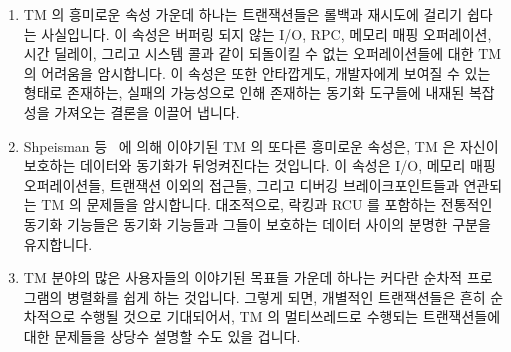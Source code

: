 \begin{enumerate}
\item	TM 의 흥미로운 속성 가운데 하나는 트랜잭션들은 롤백과 재시도에 걸리기
	쉽다는 사실입니다.
	이 속성은 버퍼링 되지 않는 I/O, RPC, 메모리 매핑 오퍼레이션, 시간
	딜레이, 그리고  시스템 콜과 같이 되돌이킬 수 없는
	오퍼레이션들에 대한 TM 의 어려움을 암시합니다.
	이 속성은 또한 안타깝게도, 개발자에게 보여질 수 있는 형태로 존재하는,
	실패의 가능성으로 인해 존재하는 동기화 도구들에 내재된 복잡성을
	가져오는 결론을 이끌어 냅니다.
\item	Shpeisman 등~\cite{TatianaShpeisman2009CppTM} 에 의해 이야기된 TM 의
	또다른 흥미로운 속성은, TM 은 자신이 보호하는 데이터와 동기화가
	뒤엉켜진다는 것입니다.
	이 속성은 I/O, 메모리 매핑 오퍼레이션들, 트랜잭션 이외의 접근들, 그리고
	디버깅 브레이크포인트들과 연관되는 TM 의 문제들을 암시합니다.
	대조적으로, 락킹과 RCU 를 포함하는 전통적인 동기화 기능들은 동기화
	기능들과 그들이 보호하는 데이터 사이의 분명한 구분을 유지합니다.
\item	TM 분야의 많은 사용자들의 이야기된 목표들 가운데 하나는 커다란 순차적
	프로그램의 병렬화를 쉽게 하는 것입니다.
	그렇게 되면, 개별적인 트랜잭션들은 흔히 순차적으로 수행될 것으로
	기대되어서, TM 의 멀티쓰레드로 수행되는 트랜잭션들에 대한 문제들을
	상당수 설명할 수도 있을 겁니다.

\end{enumerate}

